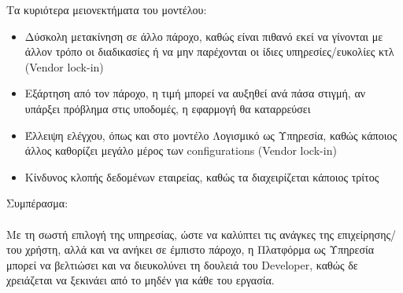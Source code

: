 \documentclass{article}
\begin{document}
Τα κυριότερα μειονεκτήματα του μοντέλου:
\begin{itemize}
\item Δύσκολη μετακίνηση σε άλλο πάροχο, καθώς είναι πιθανό εκεί να
γίνονται με άλλον τρόπο οι διαδικασίες ή να μην παρέχονται οι ίδιες
υπηρεσίες/ευκολίες κτλ (Vendor
lock-in)
\item Εξάρτηση από τον πάροχο, η τιμή μπορεί να αυξηθεί ανά πάσα στιγμή,
αν υπάρξει πρόβλημα στις υποδομές, η εφαρμογή θα καταρρεύσει
\item Έλλειψη ελέγχου, όπως και στο μοντέλο Λογισμικό ως Υπηρεσία, καθώς
κάποιος άλλος καθορίζει μεγάλο μέρος των
configurations (Vendor lock-in)
\item Κίνδυνος κλοπής δεδομένων εταιρείας, καθώς τα διαχειρίζεται κάποιος
τρίτος
\end{itemize}
Συμπέρασμα: \\ \\
Με τη σωστή επιλογή της υπηρεσίας, ώστε να καλύπτει τις ανάγκες της
επιχείρησης/του χρήστη, αλλά και να ανήκει σε έμπιστο πάροχο, η Πλατφόρμα
ως Υπηρεσία μπορεί να βελτιώσει και να διευκολύνει τη δουλειά του
Developer, καθώς δε
χρειάζεται να ξεκινάει από το μηδέν για κάθε του εργασία.
\end{document}
